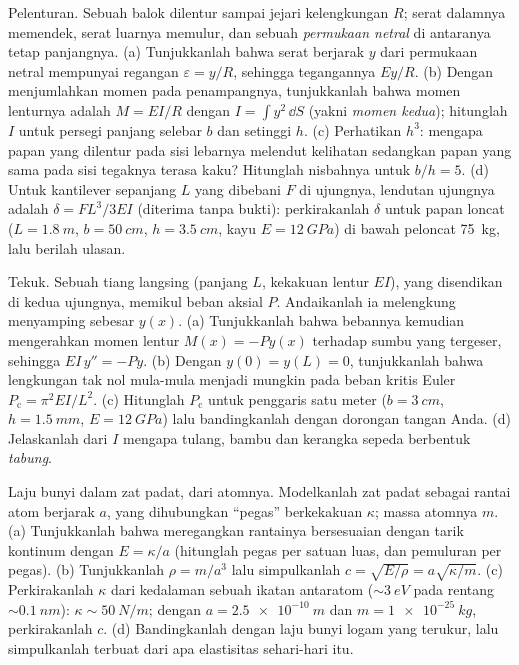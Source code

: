 \begin{exercise}[$\star\star\star$]\label{exo:b3:continuum-elasticity:10}
Pelenturan. Sebuah balok dilentur sampai jejari kelengkungan $R$; serat
dalamnya memendek, serat luarnya memulur, dan sebuah \emph{permukaan
netral} di antaranya tetap panjangnya. (a) Tunjukkanlah bahwa serat
berjarak $y$ dari permukaan netral mempunyai regangan $\varepsilon = y/R$,
sehingga tegangannya $Ey/R$. (b) Dengan menjumlahkan momen pada
penampangnya, tunjukkanlah bahwa momen lenturnya adalah
$M = EI/R$ dengan $I = \int y^2\,\dd S$ (yakni \emph{momen kedua});
hitunglah $I$ untuk persegi panjang selebar $b$ dan setinggi $h$. (c)
Perhatikan $h^3$: mengapa papan yang dilentur pada sisi lebarnya melendut
kelihatan sedangkan papan yang sama pada sisi tegaknya terasa kaku?
Hitunglah nisbahnya untuk $b/h = 5$. (d) Untuk kantilever sepanjang $L$
yang dibebani $F$ di ujungnya, lendutan ujungnya adalah
$\delta = FL^3/3EI$ (diterima tanpa bukti): perkirakanlah $\delta$ untuk
papan loncat ($L = \qty{1.8}{m}$, $b = \qty{50}{cm}$, $h = \qty{3.5}{cm}$, kayu $E
= \qty{12}{GPa}$) di bawah peloncat \qty{75}{kg}, lalu berilah ulasan.
\end{exercise}

\begin{exercise}[$\star\star\star$]\label{exo:b3:continuum-elasticity:11}
Tekuk. Sebuah tiang langsing (panjang $L$, kekakuan lentur $EI$), yang
disendikan di kedua ujungnya, memikul beban aksial $P$. Andaikanlah ia
melengkung menyamping sebesar $y(x)$. (a) Tunjukkanlah bahwa bebannya
kemudian mengerahkan momen lentur
$M(x) = -Py(x)$ terhadap sumbu yang tergeser, sehingga $EI\,y'' = -Py$.
(b) Dengan $y(0) = y(L) = 0$, tunjukkanlah bahwa lengkungan tak nol
mula-mula menjadi mungkin pada beban kritis Euler
$P_{\text{c}} = \pi^2EI/L^2$. (c) Hitunglah $P_{\text{c}}$ untuk
penggaris satu meter ($b = \qty{3}{cm}$, $h = \qty{1.5}{mm}$, $E = \qty{12}{GPa}$)
lalu bandingkanlah dengan dorongan tangan Anda. (d) Jelaskanlah dari $I$
mengapa tulang, bambu dan kerangka sepeda berbentuk \emph{tabung}.
\end{exercise}

\begin{exercise}[$\star\star\star$]\label{exo:b3:continuum-elasticity:12}
Laju bunyi dalam zat padat, dari atomnya. Modelkanlah zat padat sebagai
rantai atom berjarak $a$, yang dihubungkan ``pegas'' berkekakuan $\kappa$;
massa atomnya $m$. (a) Tunjukkanlah bahwa meregangkan rantainya
bersesuaian dengan tarik kontinum dengan $E = \kappa/a$ (hitunglah pegas
per satuan luas, dan pemuluran per pegas). (b) Tunjukkanlah $\rho = m/a^3$
lalu simpulkanlah $c =
\sqrt{E/\rho} = a\sqrt{\kappa/m}$. (c) Perkirakanlah $\kappa$ dari
kedalaman sebuah ikatan antaratom ($\sim\qty{3}{eV}$ pada rentang $\sim
\qty{0.1}{nm}$): $\kappa \sim \qty{50}{N/m}$; dengan $a =
\qty{2.5e-10}{m}$ dan $m = \qty{1e-25}{kg}$, perkirakanlah $c$. (d)
Bandingkanlah dengan laju bunyi logam yang terukur, lalu simpulkanlah
terbuat dari apa elastisitas sehari-hari itu.
\end{exercise}

